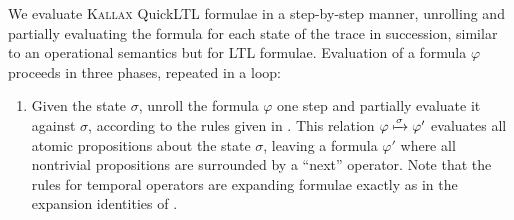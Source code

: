 \documentclass[sigplan,nonacm,10pt]{acmart}
\makeatletter
\newcommand{\QuickLTL}[0]{%
    \if@ACM@anonymous%
    \textsc{Kallax}%
    \else%
    QuickLTL%
    \fi\xspace}
\makeatother
\begin{document}
We evaluate \QuickLTL formulae in a step-by-step manner, unrolling and partially evaluating the formula
for each state of the trace in succession, similar to an operational semantics but for LTL formulae.
Evaluation of a formula $\varphi$ proceeds in three phases, repeated in a loop:
\begin{enumerate}
  \item Given the state $\sigma$, unroll the formula $\varphi$ one step and partially evaluate it against $\sigma$, according to the rules given in . This relation $\varphi \xmapsto{\sigma} \varphi'$ evaluates all atomic propositions about the state $\sigma$, leaving a formula $\varphi'$ where
  all nontrivial propositions are surrounded by a ``next'' operator. Note that the rules for temporal operators are expanding formulae exactly as in the expansion identities of .


\end{enumerate}
\end{document}
